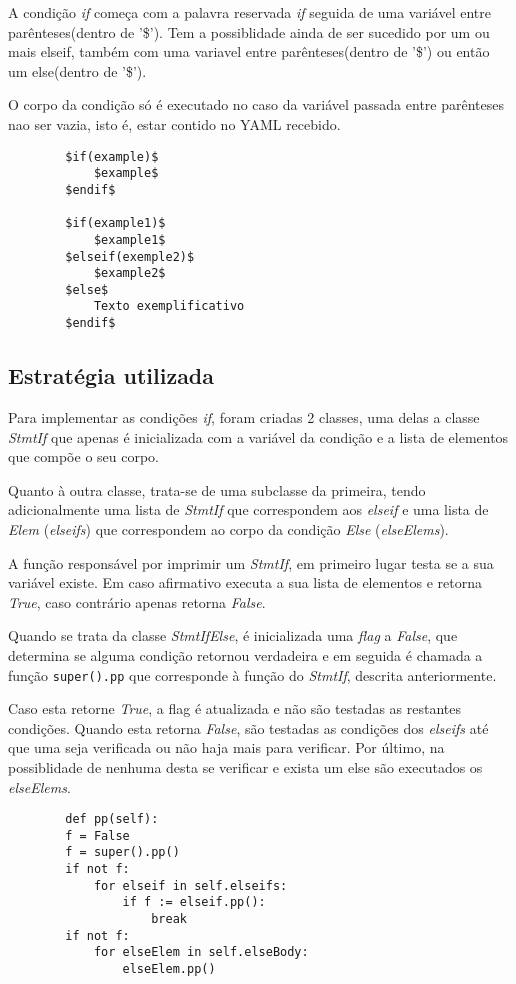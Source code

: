 \documentclass[../relatorio.tex]{subfiles}
\begin{document}
    A condição \textit{if} começa com a palavra reservada \textit{if}
    seguida de uma variável entre parênteses(dentro de '\$'). Tem a
    possiblidade ainda de ser sucedido por um ou mais elseif, também com 
    uma variavel entre parênteses(dentro de '\$') ou então um else(dentro de '\$').
    
    O corpo da condição só é executado no caso da variável passada entre parênteses
    nao ser vazia, isto é, estar contido no YAML recebido.

    \begin{verbatim}
        $if(example)$
            $example$
        $endif$

        $if(example1)$
            $example1$
        $elseif(exemple2)$
            $example2$
        $else$
            Texto exemplificativo   
        $endif$
    \end{verbatim}

    \subsection*{Estratégia utilizada}

    Para implementar as condições \textit{if}, foram criadas 2 classes,
    uma delas a classe \textit{StmtIf} que apenas é inicializada com 
    a variável da condição e a lista de elementos que compõe o seu corpo.

    Quanto à outra classe, trata-se de uma subclasse da primeira, tendo 
    adicionalmente uma lista de \textit{StmtIf} que correspondem aos
    \textit{elseif} e uma lista de \textit{Elem} (\textit{elseifs}) que correspondem ao corpo
    da condição \textit{Else} (\textit{elseElems}). 

    A função responsável por imprimir um \textit{StmtIf}, em primeiro lugar testa se a sua 
    variável existe. Em caso afirmativo executa a sua lista de elementos e retorna \textit{True},
    caso contrário apenas retorna \textit{False}. 
    
    Quando se trata da classe \textit{StmtIfElse}, é inicializada uma \textit{flag} a \textit{False},
    que determina se alguma condição retornou verdadeira e em seguida é chamada a função 
    \texttt{super().pp} que corresponde à função do \textit{StmtIf}, descrita anteriormente.

    Caso esta retorne \textit{True}, a flag é atualizada e não são testadas as restantes condições. 
    Quando esta retorna \textit{False}, são testadas as condições dos \textit{elseifs} até que uma seja verificada ou não haja mais para verificar. 
    Por último, na possiblidade de nenhuma desta se verificar e exista um else
    são executados os \textit{elseElems}.
    \begin{verbatim}
        def pp(self):
        f = False
        f = super().pp()
        if not f:
            for elseif in self.elseifs:
                if f := elseif.pp():
                    break
        if not f:
            for elseElem in self.elseBody:
                elseElem.pp()
    \end{verbatim}    
\end{document}

